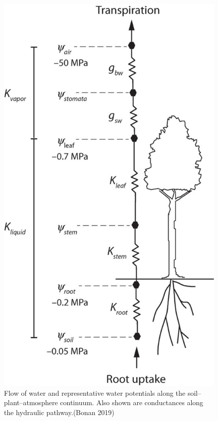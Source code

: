 \documentclass[12pt,oneside]{book}
\begin{document}
\begin{figure}

{\centering \includegraphics[width=0.8\linewidth]{figures/chap2/hydraulics} 

}

\caption{Flow of water and representative water potentials along the soil–plant–atmosphere continuum. Also shown are conductances along the hydraulic pathway.(Bonan 2019)}\label{fig:f218}
\end{figure}
\end{document}
